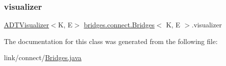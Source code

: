 \subsubsection{\texorpdfstring{visualizer}{visualizer}}
{\footnotesize\ttfamily \hyperlink{classbridges_1_1base_1_1_a_d_t_visualizer}{A\+D\+T\+Visualizer}$<$K, E$>$ \hyperlink{classbridges_1_1connect_1_1_bridges}{bridges.\+connect.\+Bridges}$<$ K, E $>$.visualizer\hspace{0.3cm}{\ttfamily [protected]}}



The documentation for this class was generated from the following file\+:\begin{DoxyCompactItemize}
\item 
link/connect/\hyperlink{_bridges_8java}{Bridges.\+java}\end{DoxyCompactItemize}
